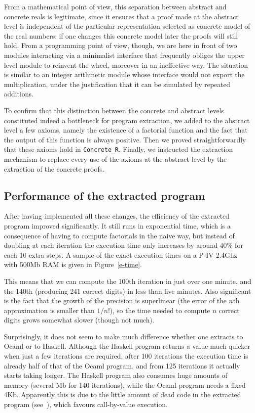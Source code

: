 \documentclass{entcs}
\begin{document}
From a mathematical point of view, this separation between abstract
and concrete reals is legitimate, since it ensures that a
proof made at the abstract level is independent of the particular
representation selected as concrete model of the real numbers: if one
changes this concrete model later the proofs will still hold.
From a programming point of view, though, we are here in
front of two modules interacting via a minimalist interface
that frequently obliges the upper level module to reinvent
the wheel, moreover in an ineffective way.  The situation is similar
to an integer arithmetic module whose interface would not export
the multiplication, under the justification that it can be simulated
by repeated additions.

To confirm that this distinction between the concrete and abstract
levels constituted indeed a bottleneck for program extraction, we
added to the abstract level a few axioms, namely the existence of a
factorial function and the fact that the output of this function is
always positive. Then we proved straightforwardly that these axioms
hold in \texttt{Concrete\_R}.
Finally, we instructed the extraction mechanism to replace every
use of the axioms at the abstract level by the extraction of the
concrete proofs. 

\subsection{Performance of the extracted program}

After having implemented all these changes, the efficiency of the
extracted program improved significantly.  It still runs in
exponential time, which is a consequence of having to compute
factorials in the naive way, but instead of doubling at each iteration
the execution time only increases by around $40\%$ for each 10 extra
steps.  A sample of the exact execution times on a P-IV 2.4Ghz with
500Mb RAM is given in Figure~\ref{e-time}.

This means that we can compute the 100th iteration in just over one
minute, and the 140th (producing 241 correct digits) in less than
five minutes.  Also significant is the fact that the growth of the
precision is superlinear (the error of the $n$th approximation is
smaller than $1/n!$), so the time needed to compute $n$ correct digits
grows somewhat slower (though not much).

Surprisingly, it does not seem to make much difference whether one extracts
to Ocaml or to Haskell.  Although the Haskell program returns a value much
quicker when just a few iterations are required, after 100 iterations the
execution time is already half of that of the Ocaml program, and from 125
iterations it actually starts taking longer.  The Haskell program also
consumes huge amounts of memory (several Mb for 140 iterations), while the
Ocaml program needs a fixed 4Kb.
Apparently this is due to the little amount of dead code in the extracted
program (see~\cite{lcf:spi:03}), which favours call-by-value execution.
\end{document}
